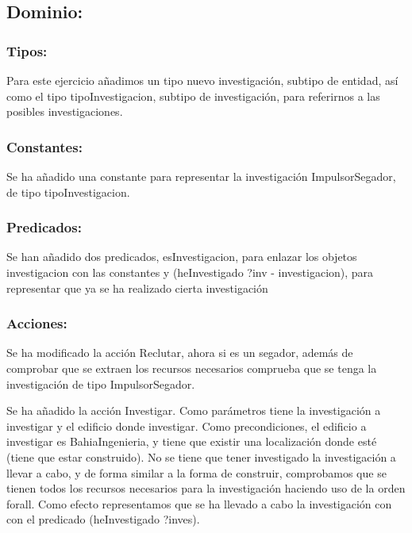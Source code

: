 \documentclass[10pt, spanish]{article}
\begin{document}
\subsection{Dominio:}

\subsubsection{Tipos:}

Para este ejercicio añadimos un tipo nuevo investigación, subtipo de entidad, así como el tipo tipoInvestigacion, subtipo de investigación, para referirnos a las posibles investigaciones.

\subsubsection{Constantes:}

Se ha añadido una constante para representar la investigación ImpulsorSegador, de tipo tipoInvestigacion.

\subsubsection{Predicados:}

Se han añadido dos predicados, esInvestigacion, para enlazar los objetos investigacion con las constantes y (heInvestigado ?inv - investigacion), para representar que ya se ha realizado cierta investigación

\subsubsection{Acciones:}

Se ha modificado la acción Reclutar, ahora si es un segador, además de comprobar que se extraen los recursos necesarios comprueba que se tenga la investigación de tipo ImpulsorSegador.

Se ha añadido la acción Investigar. Como parámetros tiene la investigación a investigar y el edificio donde investigar. Como precondiciones, el edificio a investigar es BahiaIngenieria,  y tiene que existir una localización donde esté (tiene que estar construido). No se tiene que tener investigado la investigación a llevar a cabo, y de forma similar a la forma de construir, comprobamos que se tienen todos los recursos necesarios para la investigación haciendo uso de la orden forall. Como efecto representamos que se ha llevado a cabo la investigación con con el predicado (heInvestigado ?inves).
\end{document}
